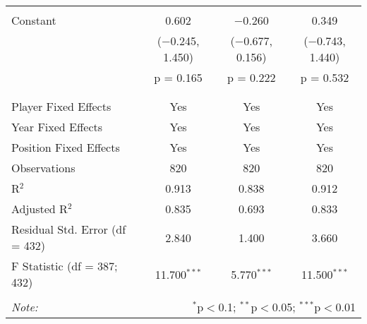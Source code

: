 \documentclass[12pt]{article}
\begin{document}
\begin{landscape}
\begin{table}[!htbp]
\begin{tabular}{@{\extracolsep{5pt}}lccc}
				& & & \\ 
				Constant & 0.602 & $-$0.260 & 0.349 \\ 
				& ($-$0.245, 1.450) & ($-$0.677, 0.156) & ($-$0.743, 1.440) \\ 
				& p = 0.165 & p = 0.222 & p = 0.532 \\ 
				& & & \\ 
				\hline \\[-1.8ex] 
				Player Fixed Effects & Yes & Yes & Yes \\ 
				Year Fixed Effects & Yes & Yes & Yes \\ 
				Position Fixed Effects & Yes & Yes & Yes \\ 
				Observations & 820 & 820 & 820 \\ 
				R$^{2}$ & 0.913 & 0.838 & 0.912 \\ 
				Adjusted R$^{2}$ & 0.835 & 0.693 & 0.833 \\ 
				Residual Std. Error (df = 432) & 2.840 & 1.400 & 3.660 \\ 
				F Statistic (df = 387; 432) & 11.700$^{***}$ & 5.770$^{***}$ & 11.500$^{***}$ \\ 
				\hline 
				\hline \\[-1.8ex] 
				\textit{Note:}  & \multicolumn{3}{r}{$^{*}$p$<$0.1; $^{**}$p$<$0.05; $^{***}$p$<$0.01} \\ 
			\end{tabular} 
		\end{table}
		

\end{landscape}
\end{document}
